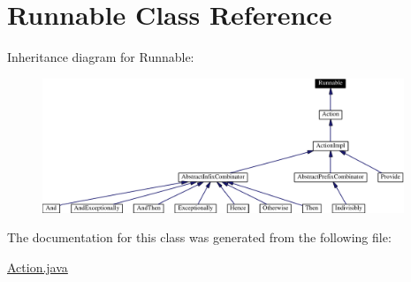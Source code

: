 \hypertarget{classRunnable}{
\section{Runnable  Class Reference}
\label{classRunnable}
}
Inheritance diagram for Runnable:\begin{figure}[H]
\begin{center}
\leavevmode
\includegraphics[width=307pt]{classRunnable__inherit__graph}
\end{center}
\end{figure}


The documentation for this class was generated from the following file:\begin{CompactItemize}
\item 
\hyperlink{Action_8java-source}{Action.java}\end{CompactItemize}
